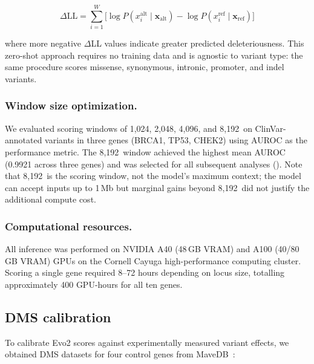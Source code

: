 \begin{equation}
  \Delta\text{LL} = \sum_{i=1}^{W}
    \bigl[\log P(x_i^{\text{alt}} \mid \mathbf{x}_{\text{alt}})
    - \log P(x_i^{\text{ref}} \mid \mathbf{x}_{\text{ref}})\bigr]
  \label{eq:delta_ll}
\end{equation}

\noindent where more negative $\Delta$LL values indicate greater predicted
deleteriousness. This zero-shot approach requires no training data and is
agnostic to variant type: the same procedure scores missense, synonymous,
intronic, promoter, and indel variants.

\subsubsection*{Window size optimization.}

We evaluated scoring windows of 1,024, 2,048, 4,096, and 8,192\,\bp{} on
ClinVar-annotated variants in three genes (BRCA1, TP53, CHEK2) using AUROC as
the performance metric. The 8,192\,\bp{} window achieved the highest mean AUROC
(0.9921 across three genes) and was selected for all subsequent analyses
(). Note that 8,192\,\bp{} is the scoring window, not
the model's maximum context; the model can accept inputs up to 1\,Mb but
marginal gains beyond 8,192\,\bp{} did not justify the additional compute cost.

\subsubsection*{Computational resources.}

All inference was performed on NVIDIA A40 (48\,GB VRAM) and A100 (40/80\,GB
VRAM) GPUs on the Cornell Cayuga high-performance computing cluster. Scoring
a single gene required 8--72 hours depending on locus size, totalling
approximately 400 GPU-hours for all ten genes.

\subsection{DMS calibration}
\label{sec:methods_dms}

To calibrate Evo2 scores against experimentally measured variant effects, we
obtained DMS datasets for four control genes from MaveDB~\cite{MaveDB_2019}:

